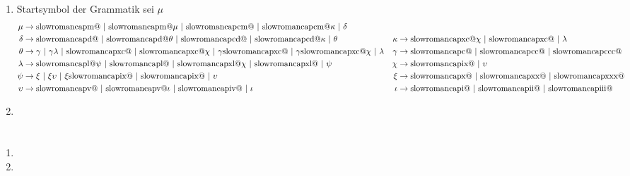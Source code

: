 \documentclass[a4paper,10pt]{scrartcl}
\makeatletter
\newcommand{\Rm}[1]{\textrm{\expandafter\@slowromancap\romannumeral #1@}}
\makeatother
\begin{document}
\section{}
\begin{enumerate}
 \item  Startsymbol der Grammatik sei $\mu$
        \begin{align*}
         \mu &\to \Rm{1000}\ |\ \Rm{1000}\mu\ |\ \Rm{900}\ |\ \Rm{900}\kappa\ |\ \delta && \\
         \delta &\to \Rm{500}\ |\ \Rm{500}\theta\ |\ \Rm{400}\ |\ \Rm{400}\kappa\ |\ \theta &
            \kappa &\to \Rm{90}\chi\ |\ \Rm{90}\ |\ \lambda \\
        \theta &\to \gamma\ |\ \gamma\lambda\ |\ \Rm{90}\ |\ \Rm{90}\chi\ |\ \gamma \Rm{90}\ |\ \gamma \Rm{90}\chi\ |\ \lambda &
            \gamma &\to \Rm{100}\ |\ \Rm{200}\ |\ \Rm{300} \\
        \lambda &\to \Rm{50}\psi\ |\ \Rm{50}\ |\ \Rm{40}\chi\ |\ \Rm{40}\ |\ \psi &
            \chi &\to \Rm{9}\ |\ \upsilon \\
        \psi &\to \xi\ |\ \xi\upsilon\ |\ \xi \Rm{9}\ |\ \Rm{9}\ |\ \upsilon &
            \xi &\to \Rm{10}\ |\ \Rm{20}\ |\ \Rm{30} \\
        \upsilon &\to \Rm{5}\ |\ \Rm{5}\iota\ |\ \Rm{4}\ |\ \iota &
            \iota &\to \Rm{1}\ |\ \Rm{2}\ |\ \Rm{3}
        \end{align*}
 \item  
\end{enumerate}

\section{}
\begin{enumerate}
 \item  
 \item  
\end{enumerate}
\end{document}
